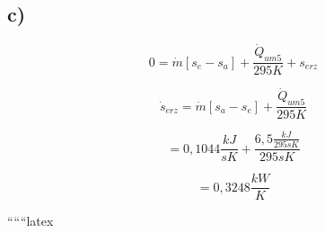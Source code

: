 

\subsection*{c)}

\[
0 = \dot{m} [s_e - s_a] + \frac{\dot{Q}_{um5}}{295K} + s_{erz}
\]

\[
\dot{s}_{erz} = \dot{m} [s_a - s_e] + \frac{\dot{Q}_{um5}}{295K}
\]

\[
= 0,1044 \frac{kJ}{sK} + \frac{6,5 \frac{kJ}{295sK}}{295sK}
\]

\[
= 0,3248 \frac{kW}{K}
\]

``````latex